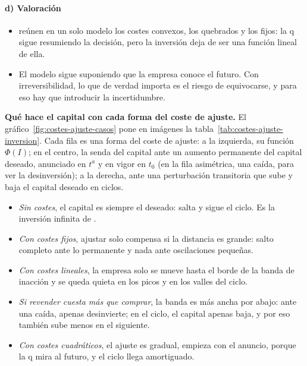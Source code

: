 \documentclass[11pt]{article}
\begin{document}
\paragraph{d) Valoración}

\begin{itemize}
\item \textcite{AbelEberly1994Unified} reúnen en un solo modelo los costes convexos, los quebrados y los fijos: la q sigue resumiendo la decisión, pero la inversión deja de ser una función lineal de ella.
\item El modelo sigue suponiendo que la empresa conoce el futuro. Con irreversibilidad, lo que de verdad importa es el riesgo de equivocarse, y para eso hay que introducir la incertidumbre.
\end{itemize}

\begin{anotaciones}
\textbf{Qué hace el capital con cada forma del coste de ajuste.} El gráfico~\ref{fig:costes-ajuste-casos} pone en imágenes la tabla~\ref{tab:costes-ajuste-inversion}. Cada fila es una forma del coste de ajuste: a la izquierda, su función $\Phi({I})$; en el centro, la senda del capital ante un aumento permanente del capital deseado, anunciado en $t^a$ y en vigor en $t_0$ (en la fila asimétrica, una caída, para ver la desinversión); a la derecha, ante una perturbación transitoria que sube y baja el capital deseado en ciclos.
\begin{figuracaja}
\caption{La senda del capital según la forma del coste de ajuste}\label{fig:costes-ajuste-casos}
\end{figuracaja}
\begin{itemize}
\item \emph{Sin costes}, el capital es siempre el deseado: salta y sigue el ciclo. Es la inversión infinita de .
\item \emph{Con costes fijos}, ajustar solo compensa si la distancia es grande: salto completo ante lo permanente y nada ante oscilaciones pequeñas.
\item \emph{Con costes lineales}, la empresa solo se mueve hasta el borde de la banda de inacción y se queda quieta en los picos y en los valles del ciclo.
\item \emph{Si revender cuesta más que comprar}, la banda es más ancha por abajo: ante una caída, apenas desinvierte; en el ciclo, el capital apenas baja, y por eso también sube menos en el siguiente.
\item \emph{Con costes cuadráticos}, el ajuste es gradual, empieza con el anuncio, porque la q mira al futuro, y el ciclo llega amortiguado.
\end{itemize}

\end{anotaciones}
\end{document}
